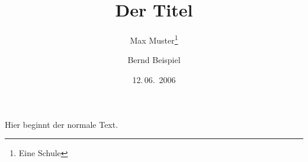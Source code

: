 \documentclass[a5paper,12pt]{scrartcl}
\begin{document}
\titlehead{Titelkopf} 
\subject{Typisierung}
\title{Der Titel}
\author{Max Muster\thanks{Eine Schule} \and Bernd Beispiel}
\date{12.\,06.~2006}
\publishers{Uni Universal}

\maketitle

Hier beginnt der normale Text.
\end{document}

